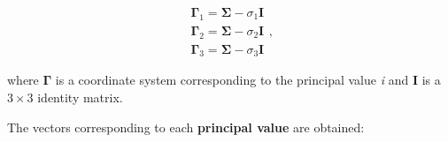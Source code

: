 \begin{itemize}
        \begin{equation}
            \begin{array}{l}
                \mathbf{\Gamma}_{1} = \mathbf{\Sigma} - \sigma_{1}\mathbf{I} \\
                \mathbf{\Gamma}_{2} = \mathbf{\Sigma} - \sigma_{2}\mathbf{I} \\
                \mathbf{\Gamma}_{3} = \mathbf{\Sigma} - \sigma_{3}\mathbf{I}
            \end{array}
        ,\end{equation}

        where $\mathbf{\Gamma}$ is a coordinate system corresponding to the
        principal value \textit{i} and $\mathbf{I}$ is a $3 \times 3$
        identity matrix.

        The vectors corresponding to each \textbf{principal value} are obtained:


\end{itemize}
